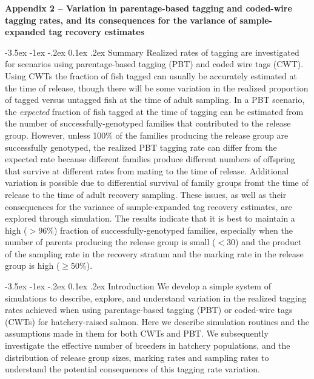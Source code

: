 \documentclass[11pt]{article}
\makeatletter
\renewcommand\section{\@startsection {section}{1}{\z@}%
                                   {-3.5ex \@plus -1ex \@minus -.2ex}%
                                   {0.1ex \@plus.2ex}%
                                   {\normalfont\large\bfseries}}
\makeatother
\begin{document}
\setcounter{page}{122}   %



{\large\bf Appendix 2 -- Variation in parentage-based tagging and coded-wire tagging rates, and its consequences for the variance of sample-expanded tag recovery estimates}

\section{Summary}
Realized rates of tagging are investigated for scenarios using parentage-based tagging (PBT)
and coded wire tags (CWT).  
Using CWTs the fraction of fish tagged can usually be accurately
estimated at the time of release, though there will be some variation in the realized
proportion of tagged versus untagged fish at the time of adult sampling.  In a PBT
scenario, the {\em expected} fraction of fish tagged at the time of tagging can be
estimated from the number of successfully-genotyped families that
contributed to the release group.  However, unless 100\% of the families producing the release
group are successfully genotyped, the realized PBT tagging rate can differ from the
expected rate because different families produce different numbers of offspring that survive
at different rates from mating to the time of release.  Additional variation is possible due to differential
survival of family groups fromt the time of release to the time of adult recovery sampling.  These issues, as well as their
consequences for the variance of sample-expanded tag recovery estimates, are explored
through simulation.  The results indicate that it is best to maintain a high ($>96\%$) fraction
of successfully-genotyped families, especially when the number of parents producing the release
group is small ($<30$) and the product of the sampling rate in the recovery stratum
and the marking rate in the release group is high ($\geq 50\%$).


\section{Introduction}
We develop a simple system of simulations to describe, explore, and understand
variation in the realized tagging rates achieved when using parentage-based tagging (PBT)
or coded-wire tags (CWTs) for hatchery-raised salmon.  Here we describe simulation routines
and the assumptions made in them for both CWTs and PBT.  We subsequently investigate the effective
number of breeders in hatchery populations, and the distribution
of release group sizes, marking rates and sampling rates to understand the potential
consequences of this tagging rate variation.
\end{document}
